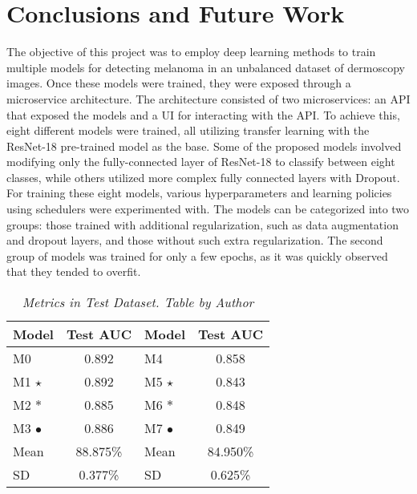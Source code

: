 \chapter{Conclusions and Future Work}
\label{cap:concl}


The objective of this project was to employ deep learning methods to train multiple models for detecting melanoma in an unbalanced dataset of dermoscopy images.
Once these models were trained, they were exposed through a microservice architecture.
The architecture consisted of two microservices: an API that exposed the models and a UI for interacting with the API.
To achieve this, eight different models were trained, all utilizing transfer learning with the ResNet-18 pre-trained model as the base.
Some of the proposed models involved modifying only the fully-connected layer of ResNet-18 to classify between eight classes,
while others utilized more complex fully connected layers with Dropout. \\

For training these eight models,
various hyperparameters and learning policies using schedulers were experimented with.
The models can be categorized into two groups: those trained with additional regularization,
such as data augmentation and dropout layers, and those without such extra regularization.
The second group of models was trained for only a few epochs, as it was quickly observed that they tended to overfit. \\

\begin{table}[H]
\centering
\begin{tabular}{lclc}
    \toprule
 Model &  Test AUC & \cellcolor{gray!50}Model & \cellcolor{gray!50}Test AUC  \\
\midrule
 M0 & 0.892 & \cellcolor{gray!50}M4 & \cellcolor{gray!50}0.858 \\
 M1 $\star$ & 0.892 & \cellcolor{gray!50}M5 $\star$ & \cellcolor{gray!50}0.843 \\
 M2 $\ast$ &  0.885 &  \cellcolor{gray!50}M6 $\ast$ & \cellcolor{gray!50}0.848 \\
 M3 $\bullet$ & 0.886 & \cellcolor{gray!50}M7 $\bullet$ & \cellcolor{gray!50}0.849 \\
 \midrule
Mean &  88.875\% & \cellcolor{gray!50}Mean & \cellcolor{gray!50}84.950\%  \\
SD &  0.377\%  &   \cellcolor{gray!50}SD &  \cellcolor{gray!50}0.625\%  \\

\bottomrule
\end{tabular}
\caption[Metrics in Test Dataset]
  {\textit{Metrics in Test Dataset. Table by Author}}
{\label{table:test-set-resume-metrics}}
\end{table}
